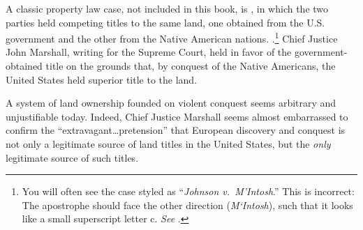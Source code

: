 
A classic property law case,
not included in this book, is , in which the two
parties held competing titles to the same land, one obtained from the U.S.
government and the other from the Native American nations.
.\footnote{You will often see the case styled as
``\emph{Johnson v.~M'Intosh}.'' This is incorrect: The apostrophe should face
the other direction (\emph{M`Intosh}), such that it looks like a small
superscript letter c. \emph{See} .}
Chief Justice John Marshall, writing for the Supreme Court, held in favor of the
government-obtained title on the grounds that, by conquest of the Native
Americans,
the United States held superior title to the land.

A system of land ownership founded on violent conquest seems arbitrary and
unjustifiable today. Indeed, Chief Justice Marshall seems almost embarrassed to
confirm the ``extravagant\ldots pretension'' that European discovery and
conquest is not only a legitimate source of land titles in the United States,
but the \textit{only} legitimate source of such titles.

